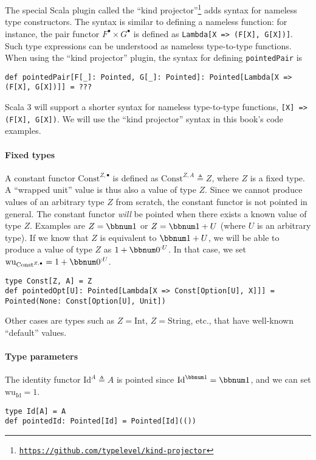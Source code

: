The special Scala plugin called the ``kind
projector''\footnote{\texttt{\href{https://github.com/typelevel/kind-projector}{https://github.com/typelevel/kind-projector}}}
adds syntax for nameless type constructors. The syntax is similar
to defining a nameless function: for instance, the pair functor $F^{\bullet}\times G^{\bullet}$
is defined as \lstinline!Lambda[X => (F[X], G[X])]!. Such type expressions
can be understood as nameless
type-to-type functions. When using the ``kind projector'' plugin,
the syntax for defining \lstinline!pointedPair! is
\begin{lstlisting}
def pointedPair[F[_]: Pointed, G[_]: Pointed]: Pointed[Lambda[X => (F[X], G[X])]] = ???
\end{lstlisting}
Scala 3 will support a shorter syntax for nameless type-to-type functions,
\lstinline![X] => (F[X], G[X])!. We will use the ``kind projector''
syntax in this book's code examples.

\paragraph{Fixed types}

A constant functor $\text{Const}^{Z,\bullet}$ is defined as $\text{Const}^{Z,A}\triangleq Z$,
where $Z$ is a fixed type. A ``wrapped unit'' value is thus also
a value of type $Z$. Since we cannot produce values of an arbitrary
type $Z$ from scratch, the constant functor is not pointed in general.
The constant functor \emph{will} be pointed when there exists a known
value of type $Z$. Examples are $Z=\bbnum 1$ or $Z=\bbnum 1+U$
(where $U$ is an arbitrary type). If we know that $Z$ is equivalent
to $\bbnum 1+U$, we will be able to produce a value of type $Z$
as $1+\bbnum 0^{:U}$. In that case, we set $\text{wu}_{\text{Const}^{Z,\bullet}}=1+\bbnum 0^{:U}$.
\begin{lstlisting}
type Const[Z, A] = Z
def pointedOpt[U]: Pointed[Lambda[X => Const[Option[U], X]]] = Pointed(None: Const[Option[U], Unit])
\end{lstlisting}
Other cases are types such as $Z=\text{Int}$, $Z=\text{String}$,
etc., that have well-known ``default'' values.

\paragraph{Type parameters}

The identity functor $\text{Id}^{A}\triangleq A$ is pointed since
$\text{Id}^{\bbnum 1}=\bbnum 1$, and we can set $\text{wu}_{\text{Id}}=1$.
\begin{lstlisting}
type Id[A] = A
def pointedId: Pointed[Id] = Pointed[Id](())
\end{lstlisting}

